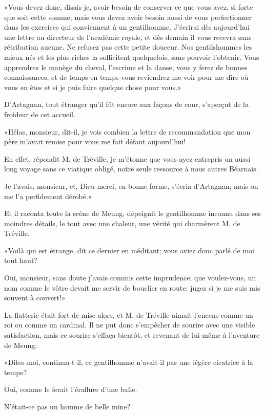 «Vous devez donc, disais-je, avoir besoin de conserver ce que vous avez, si forte que soit cette somme; mais vous devez avoir besoin aussi de vous perfectionner dans les exercices qui conviennent à un gentilhomme. J'écrirai dès aujourd'hui une lettre au directeur de l'académie royale, et dès demain il vous recevra sans rétribution aucune. Ne refusez pas cette petite douceur. Nos gentilshommes les mieux nés et les plus riches la sollicitent quelquefois, sans pouvoir l'obtenir. Vous apprendrez le manège du cheval, l'escrime et la danse; vous y ferez de bonnes connaissances, et de temps en temps vous reviendrez me voir pour me dire où vous en êtes et si je puis faire quelque chose pour vous.» 

D'Artagnan, tout étranger qu'il fût encore aux façons de cour, s'aperçut de la froideur de cet accueil. 

«Hélas, monsieur, dit-il, je vois combien la lettre de recommandation que mon père m'avait remise pour vous me fait défaut aujourd'hui! 

\speak  En effet, répondit M. de Tréville, je m'étonne que vous ayez entrepris un aussi long voyage sans ce viatique obligé, notre seule ressource à nous autres Béarnais. 

\speak  Je l'avais, monsieur, et, Dieu merci, en bonne forme, s'écria d'Artagnan; mais on me l'a perfidement dérobé.» 

Et il raconta toute la scène de Meung, dépeignit le gentilhomme inconnu dans ses moindres détails, le tout avec une chaleur, une vérité qui charmèrent M. de Tréville. 

«Voilà qui est étrange, dit ce dernier en méditant; vous aviez donc parlé de moi tout haut? 

\speak  Oui, monsieur, sans doute j'avais commis cette imprudence; que voulez-vous, un nom comme le vôtre devait me servir de bouclier en route: jugez si je me suis mis souvent à couvert!» 

La flatterie était fort de mise alors, et M. de Tréville aimait l'encens comme un roi ou comme un cardinal. Il ne put donc s'empêcher de sourire avec une visible satisfaction, mais ce sourire s'effaça bientôt, et revenant de lui-même à l'aventure de Meung: 

«Dites-moi, continua-t-il, ce gentilhomme n'avait-il pas une légère cicatrice à la tempe? 

\speak  Oui, comme le ferait l'éraflure d'une balle. 

\speak  N'était-ce pas un homme de belle mine? 

